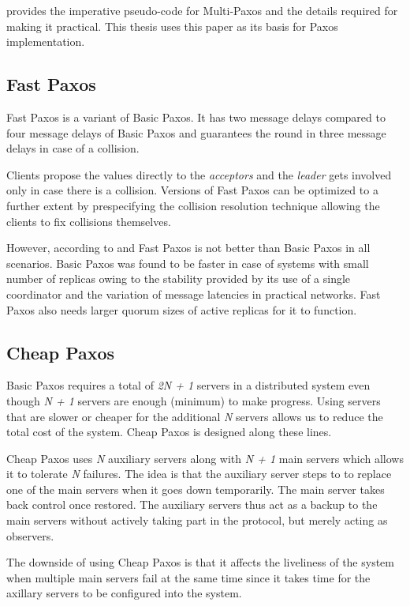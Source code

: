 \citet{Robbert2011} provides the imperative pseudo-code for Multi-Paxos and
the details required for making it practical. This thesis uses this paper as 
its basis for Paxos implementation.

\subsection{Fast Paxos}

Fast Paxos \citep{MSRTR2005112} is a variant of Basic Paxos. It has two
message delays compared to four message delays of Basic Paxos and guarantees
the round in three message delays in case of a collision.

Clients propose the values directly to the \emph{acceptors} and the 
\emph{leader} gets involved only in case there is a collision. Versions of Fast
Paxos can be optimized to a further extent by prespecifying the collision
resolution technique allowing the clients to fix collisions themselves.

However, according to \citet{Vieira08theperformance} and \citet{Junqueira2007}
Fast Paxos is not better than Basic Paxos in all scenarios. Basic Paxos was 
found to be faster in case of systems with small number of replicas owing to 
the stability provided by its use of a single coordinator and the variation
of message latencies in practical networks. Fast Paxos also needs larger quorum 
sizes of active replicas for it to function.

\subsection{Cheap Paxos}

Basic Paxos requires a total of \emph{2N + 1} servers in a distributed system 
even though \emph{N + 1} servers are enough (minimum) to make progress. 
Using servers that are slower or cheaper for the additional \emph{N} servers
allows us to reduce the total cost of the system. Cheap Paxos is designed along 
these lines.

Cheap Paxos uses \emph{N} auxiliary servers along with \emph{N + 1} main servers
which allows it to tolerate \emph{N} failures. The idea is that the auxiliary
server steps to to replace one of the main servers when it goes down 
temporarily. The main server takes back control once restored. The auxiliary
servers thus act as a backup to the main servers without actively taking part
in the protocol, but merely acting as observers.

The downside of using Cheap Paxos is that it affects the liveliness of the 
system when multiple main servers fail at the same time since it takes time
for the axillary servers to be configured into the system.

